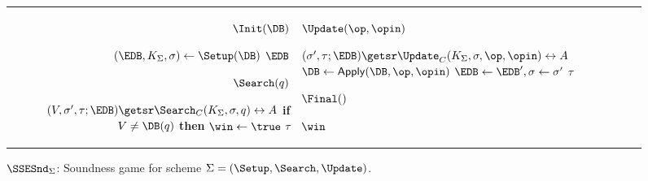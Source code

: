 

\begin{figure}[!hb]
	\centering
		\begin{tabular}{r|l}
		\hspace{-0.015\textwidth}	
		\begin{minipage}[t]{0.465\textwidth}
			\underline{$\Init(\DB)$}
			\begin{algorithmic}[0]
				\State $(\EDB, K_\Sigma, \sigma) \gets \Setup(\DB)$
				\State \Return $\EDB$
			\end{algorithmic}

			\underline{$\Search(q)$}
			\begin{algorithmic}[0]
				\State $(V,\sigma', \tau; \EDB) \getsr \Search_C(K_\Sigma,\sigma,q) \leftrightarrow A$
				\If{$V \neq \bot$}
				\State{$\sigma \gets \sigma'$}
				\State \textbf{if} {$V \neq \DB(q)$} \textbf{then} {$\win \gets \true$}
				\EndIf
				\State \Return $\tau$
			\end{algorithmic}
		\end{minipage}
		&
		\begin{minipage}[t]{0.489\textwidth}
			\underline{$\Update(\op,\opin)$}
			\begin{algorithmic}[0]
				\State $(\sigma', \tau; \EDB) \getsr \Update_C(K_\Sigma, \sigma,\op,\opin) \leftrightarrow A$
				\If{$\sigma' \neq \bot$}
				\State $\DB \gets \mathsf{Apply}(\DB,\op,\opin)$
				\State $\EDB \gets \EDB', \sigma \gets \sigma'$
				\EndIf
				\State \Return $\tau$
			\end{algorithmic}

			\underline{$\Final()$}
			\begin{algorithmic}[0]
				\State \Return $\win$
			\end{algorithmic}
			
		\end{minipage}
		\end{tabular}
	\caption[$\SSESnd_{\Sigma}$: SSE soundness game]
	{$\SSESnd_{\Sigma}$: Soundness game for scheme $\Sigma = (\Setup, \Search, \Update)$.
	}
	\label{fig:sound_sse}
\end{figure}

